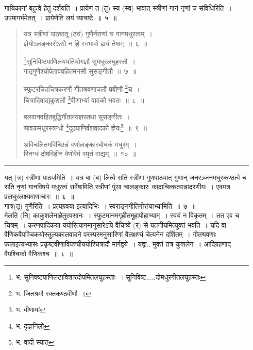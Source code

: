 \documentclass[11pt, openany]{book}
\begin{document}
{\qtt गायिकानां} बहुत्वे हेतुं दर्शयति~। प्रायेण त (तु) स्य (स्व) भावात् स्त्रीणां गानं नृणां च संविधिरिति~। {\qtt उपमागर्भमेतत्}~। प्रायेणेति लयं व्याचष्टे~॥~५~॥

\newpage

\begin{quote}
{\na  यत्र स्त्रीणां पाठ्यातू (ठ्यं) गुणैर्नराणां च गानमधुरत्वम्~।\\
 ज्ञेयोऽलङ्कारोऽसौ न हि स्वभावो ह्ययं तेषाम्~॥~६~॥

 \renewcommand{\thefootnote}{1}\footnote{भ. सुनिवष्टपाणिलटाविशारदोपमितलघुहस्ताः~। सुनिविष्ट.....दोमधुरगीतलघुहस्तः}सुनिविष्टपाणिलययतियोगज्ञौ सुमधुरलघुहस्तौ~।\\
 गातृगुणैश्चोपेताववहितमनसौ सुसङ्गीतौ~॥~७~॥

 स्फुटरचितचित्रकरणौ गीतश्रवणाचलौ प्रवीणौ \renewcommand{\thefootnote}{2}\footnote{भ. जितश्रमौ रक्तकण्ठवीणौ~।}च~।\\
 चित्रादिवाद्यकुशलौ \renewcommand{\thefootnote}{3}\footnote{भ. वीणायां}वीणाभ्यां वादकौ भवतः~॥~८~॥

 बलवानवहितबुद्धिर्गीतलयज्ञस्तथा सुसङ्गीतः~।\\
 श्रावकमधुरस्त्रग्धो \renewcommand{\thefootnote}{4}\footnote{भ. दृढानिलो}दूढपाणिर्वंशवादको ज्ञेयः\renewcommand{\thefootnote}{5}\footnote{भ. वादी स्यात्}~॥~९~॥

 अविचलितमविच्छिन्नं वर्णालङ्कारबोधकं मधुरम्~।\\
 स्निग्धं दोषविहीनं वेणोरेवं स्मृतं वाद्यम्~॥~१०~॥}
\end{quote}

\hrule

\vspace{2mm}
{\qtt यत् (त्र) स्त्रीणां पाठ्यमिति~। यत्र बा} (ब) लित्वे सति स्त्रीणां गुणपाठ्यात् गुणान् जनरञ्जनमधुरकण्ठत्वे च सति नृणां गानविषये मधुरत्वं सर्वेषामिति स्त्रीणां पुंसा चालङ्कारः कादाचित्कत्वान्नादरणीयः~। एवमत्र प्रलघुरलक्ष्यमाणाचारः~॥~६~॥\\

{\qtt गात्र(तृ) गुणैरिति}~। प्रत्यग्रवया इत्यादिभिः~। स्वराङ्गगीतिगीत्तंयाभ्यामिति~॥~७~॥\\

{\qtt  मेलति} (नि) काकुशलेनाहेतुरवसानः~। स्फुटमानमगृहीतमूहापोहाभ्याम्~। स्वयं न विकृतम्~। तत एव च चित्रम्~। करणपादिकया ययोरित्यागमानुसारेऽपि वैचित्र्ये (र) से यतनीयमित्युक्तं भवति~। यदि वा वैणिकवैपञ्चिकयोस्तुल्यकालवादने परस्परमनुसारिणां वैलक्षण्यं चेत्यनेन दर्शितम्~। गीतश्रवणाः फलाइत्यभ्यासः प्रकृष्टवीणाविपश्चीययोश्चित्रादौ मार्गद्वये~। यद्वा.. मुक्तं तत्र कुशलेन~। आदिग्रहणाद् वैपश्चिको वैणिकश्च~॥~८~॥~\\
\end{document}
